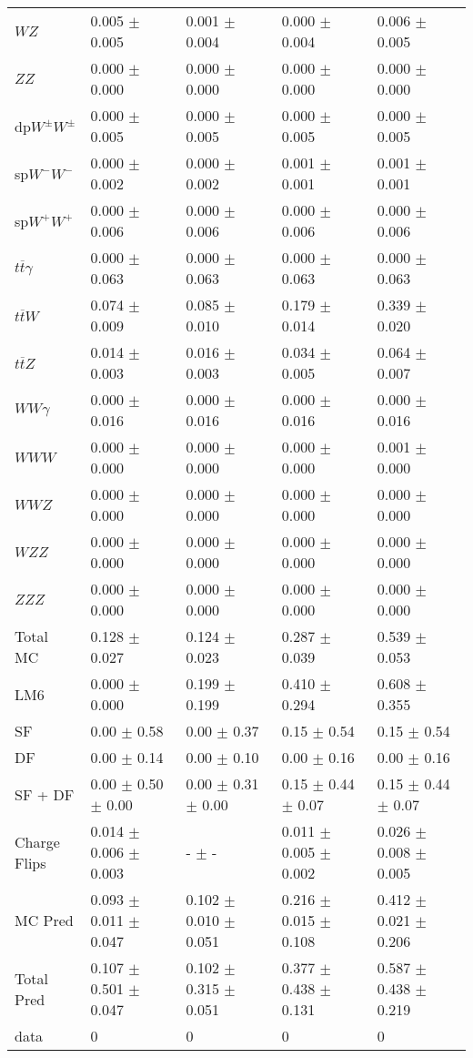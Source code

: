 \begin{tabular}{l | l l l l}
$WZ$ &  0.005 $\pm$  0.005 &  0.001 $\pm$  0.004 &   0.000 $\pm$  0.004 &  0.006 $\pm$  0.005\\
$ZZ$ &  0.000 $\pm$   0.000 &  0.000 $\pm$   0.000 &   0.000 $\pm$   0.000 &   0.000 $\pm$   0.000\\
\hline
dp$W^{\pm}W^{\pm}$ &  0.000 $\pm$  0.005 &  0.000 $\pm$  0.005 &  0.000 $\pm$  0.005 &  0.000 $\pm$  0.005\\
sp$W^{-}W^{-}$ &  0.000 $\pm$  0.002 &  0.000 $\pm$  0.002 &  0.001 $\pm$  0.001 &  0.001 $\pm$  0.001\\
sp$W^{+}W^{+}$ &  0.000 $\pm$  0.006 &  0.000 $\pm$  0.006 &  0.000 $\pm$  0.006 &  0.000 $\pm$  0.006\\
$t\overline{t}\gamma$ &  0.000 $\pm$  0.063 &  0.000 $\pm$  0.063 &  0.000 $\pm$  0.063 &  0.000 $\pm$  0.063\\
$t\overline{t}W$ &  0.074 $\pm$  0.009 &  0.085 $\pm$  0.010 &  0.179 $\pm$  0.014 &  0.339 $\pm$  0.020\\
$t\overline{t}Z$ &  0.014 $\pm$  0.003 &  0.016 $\pm$  0.003 &  0.034 $\pm$  0.005 &  0.064 $\pm$  0.007\\
$WW\gamma$ &  0.000 $\pm$  0.016 &  0.000 $\pm$  0.016 &  0.000 $\pm$  0.016 &  0.000 $\pm$  0.016\\
$WWW$ &  0.000 $\pm$   0.000 &   0.000 $\pm$   0.000 &   0.000 $\pm$   0.000 &  0.001 $\pm$   0.000\\
$WWZ$ &  0.000 $\pm$   0.000 &  0.000 $\pm$   0.000 &  0.000 $\pm$   0.000 &  0.000 $\pm$   0.000\\
$WZZ$ &   0.000 $\pm$   0.000 &  0.000 $\pm$   0.000 &   0.000 $\pm$   0.000 &   0.000 $\pm$   0.000\\
$ZZZ$ &  0.000 $\pm$   0.000 &  0.000 $\pm$   0.000 &  0.000 $\pm$   0.000 &  0.000 $\pm$   0.000\\
\hline
Total MC &  0.128 $\pm$  0.027 &  0.124 $\pm$  0.023 &  0.287 $\pm$  0.039 &  0.539 $\pm$  0.053\\
\hline\hline
\hline
LM6 &  0.000 $\pm$  0.000 &  0.199 $\pm$  0.199 &  0.410 $\pm$  0.294 &  0.608 $\pm$  0.355\\
\hline\hline
\hline\hline
 SF  & 0.00 $\pm$ 0.58 & 0.00 $\pm$ 0.37 & 0.15 $\pm$ 0.54 & 0.15 $\pm$ 0.54\\
 DF  & 0.00 $\pm$ 0.14 & 0.00 $\pm$ 0.10 & 0.00 $\pm$ 0.16 & 0.00 $\pm$ 0.16\\
\hline
 SF + DF  & 0.00 $\pm$ 0.50 $\pm$ 0.00 & 0.00 $\pm$ 0.31 $\pm$ 0.00 & 0.15 $\pm$ 0.44 $\pm$ 0.07 & 0.15 $\pm$ 0.44 $\pm$ 0.07\\
\hline\hline
Charge Flips & 0.014 $\pm$ 0.006 $\pm$ 0.003 & - $\pm$ - & 0.011 $\pm$ 0.005 $\pm$ 0.002 & 0.026 $\pm$ 0.008 $\pm$ 0.005\\
\hline\hline
\hline
MC Pred &  0.093 $\pm$  0.011 $\pm$  0.047 &  0.102 $\pm$  0.010 $\pm$  0.051 &  0.216 $\pm$  0.015 $\pm$  0.108 &  0.412 $\pm$  0.021 $\pm$  0.206\\
\hline\hline
Total Pred &  0.107 $\pm$  0.501 $\pm$  0.047 &  0.102 $\pm$  0.315 $\pm$  0.051 &  0.377 $\pm$  0.438 $\pm$  0.131 &  0.587 $\pm$  0.438 $\pm$  0.219\\
\hline\hline
data & 0 & 0 & 0 & 0\\
\hline\hline
\end{tabular}
